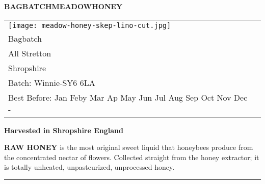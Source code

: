 \documentclass[10pt, a4paper]{letter}
\newcommand{\MONTH}{%
  \ifcase\the\month
  \or Jan%
  \or Feby%
  \or Mar%
  \or Ap%
  \or May%
  \or Jun%
  \or Jul%
  \or Aug%
  \or Sep%
  \or Oct%
  \or Nov%
  \or Dec%
  \fi}
\begin{document}

\newcommand\honeylabel{%
{\fontsize{15pt}{20pt}\selectfont  \textbf{BAGBATCH\hfil MEADOW\hfil HONEY}} 
  \begin{tabular}{ll}%
    \begin{minipage}{2cm}%
      \smallskip
      \texttt{[image: meadow-honey-skep-lino-cut.jpg]}
    \end{minipage}%
    &
    \begin{minipage}{4.5cm}
     \par
      454g 1lb \hfill Joe Collins\\
      \footnotesize\strut\hfill Bagbatch\\
      \strut\hfill All Stretton\\
      \strut\hfill  Shropshire\\
      Batch: Winnie-\the\month \hfill SY6 6LA\\
      \AdvanceDate[730]%
      Best Before: \MONTH-\the\year{} \hfill\strut 
    \end{minipage}
  \end{tabular}
{\fontsize{14pt}{20pt}\selectfont  \textbf{Harvested in Shropshire England}}
}%

\begin{labels}
%
{%
  \honeylabel
  
}%
\end{labels}

\LeftLabelBorder=5mm%
\RightLabelBorder=5mm%
\TopLabelBorder=5mm%
\BottomLabelBorder=5mm%
\LabelSetup%
\newcommand\rawlabel{%
  \small
  {\bf RAW HONEY} is the most original sweet liquid that honeybees produce from the concentrated nectar of flowers. 
   Collected straight from the honey extractor; it is totally unheated, unpasteurized, unprocessed honey.\vfill
}%

\begin{labels}
%
{%
  \rawlabel
  
}%
\end{labels}


\LeftPageMargin=0mm
\LabelSetup
\setlength{\parskip}{1em}
%
{%
  \rule{\paperwidth}{3pt}\par\par
}%
\end{document}
